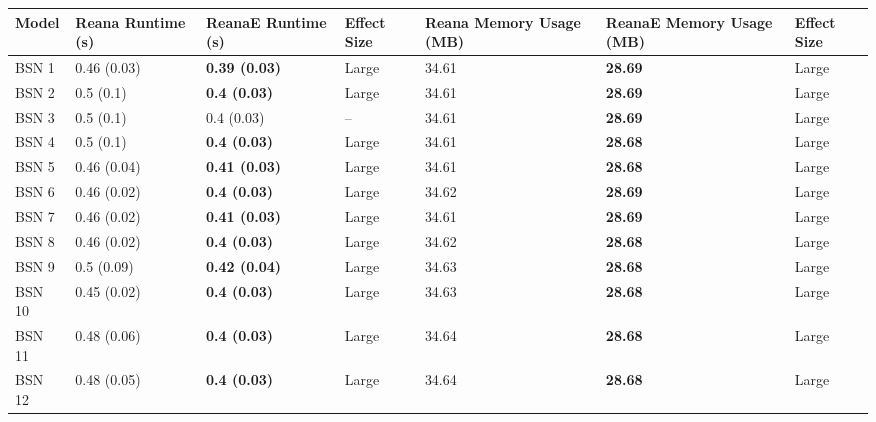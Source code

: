 \begin{tabular}{lllllll}
\toprule
  Model & Reana Runtime (s) &    ReanaE Runtime (s) & Effect Size & Reana Memory Usage (MB) & ReanaE Memory Usage (MB) & Effect Size \\
\midrule
  BSN 1 &       0.46 (0.03) &  \textbf{0.39 (0.03)} &       Large &                   34.61 &           \textbf{28.69} &       Large \\
  BSN 2 &         0.5 (0.1) &   \textbf{0.4 (0.03)} &       Large &                   34.61 &           \textbf{28.69} &       Large \\
  BSN 3 &         0.5 (0.1) &            0.4 (0.03) &          -- &                   34.61 &           \textbf{28.69} &       Large \\
  BSN 4 &         0.5 (0.1) &   \textbf{0.4 (0.03)} &       Large &                   34.61 &           \textbf{28.68} &       Large \\
  BSN 5 &       0.46 (0.04) &  \textbf{0.41 (0.03)} &       Large &                   34.61 &           \textbf{28.68} &       Large \\
  BSN 6 &       0.46 (0.02) &   \textbf{0.4 (0.03)} &       Large &                   34.62 &           \textbf{28.69} &       Large \\
  BSN 7 &       0.46 (0.02) &  \textbf{0.41 (0.03)} &       Large &                   34.61 &           \textbf{28.69} &       Large \\
  BSN 8 &       0.46 (0.02) &   \textbf{0.4 (0.03)} &       Large &                   34.62 &           \textbf{28.68} &       Large \\
  BSN 9 &        0.5 (0.09) &  \textbf{0.42 (0.04)} &       Large &                   34.63 &           \textbf{28.68} &       Large \\
 BSN 10 &       0.45 (0.02) &   \textbf{0.4 (0.03)} &       Large &                   34.63 &           \textbf{28.68} &       Large \\
 BSN 11 &       0.48 (0.06) &   \textbf{0.4 (0.03)} &       Large &                   34.64 &           \textbf{28.68} &       Large \\
 BSN 12 &       0.48 (0.05) &   \textbf{0.4 (0.03)} &       Large &                   34.64 &           \textbf{28.68} &       Large \\
\bottomrule
\end{tabular}
